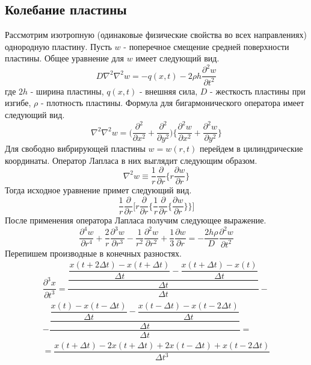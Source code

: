 \subsection{Колебание пластины}
Рассмотрим изотропную (одинаковые физические свойства во всех направлениях) однородную пластину. Пусть $w$ - поперечное смещение средней поверхности пластины.
Общее уравнение для $w$ имеет следующий вид.
\begin{equation}
  D\nabla^2\nabla^2w=-q(x,t)-2\rho h \dfrac{\partial^2 w}{\partial t^2}
\end{equation}
где $2h$ - ширина пластины, $q(x,t)$ - внешняя сила, $D$ - жесткость пластины при изгибе, $\rho$ - плотность пластины.
Формула для бигармонического оператора имеет следующий вид.
\begin{equation}
  \nabla^2\nabla^2w=\bigg(\dfrac{\partial^2}{\partial x^2}+\dfrac{\partial^2}{\partial y^2}\bigg)\bigg\{\dfrac{\partial^2 w}{\partial x^2}+\dfrac{\partial^2 w}{\partial y^2}\bigg\}
\end{equation}
Для свободно вибрирующей пластины $w=w(r,t)$ перейдем в цилиндрические координаты. Оператор Лапласа в них выглядит следующим образом.
\begin{equation}
  \nabla^2 w\equiv \dfrac{1}{r}\dfrac{\partial}{\partial r}\bigg\{r\dfrac{\partial w}{\partial r}\bigg\}
\end{equation}
Тогда исходное уравнение примет следующий вид.
\begin{equation}
  \dfrac{1}{r}\dfrac{\partial}{\partial r}\bigg[r\dfrac{\partial }{\partial r}\bigg\{\dfrac{1}{r}\dfrac{\partial}{\partial r}\bigg\{\dfrac{\partial w}{\partial r}\bigg\}\bigg\}\bigg]
\end{equation}
После применения оператора Лапласа получим следующее выражение.
\begin{equation}
\dfrac{\partial^4 w}{\partial r^4}+\dfrac{2}{r}\dfrac{\partial^3 w}{\partial r^3}-\dfrac{1}{r^2}\dfrac{\partial^2 w}{\partial r^2}+\dfrac{1}
{3}\dfrac{\partial w}{\partial r}=-\dfrac{2h\rho}{D}\dfrac{\partial^2 w}{\partial t^2}
\end{equation}
Перепишем производные в конечных разностях.
\begin{equation}
\begin{split}
  \dfrac{\partial^3 x}{\partial t^3}=\dfrac{\dfrac{\dfrac{x(t+2\Delta t)-x(t+\Delta t)}{\Delta t}-\dfrac{x(t+\Delta t)-x(t)}{\Delta t}}{\Delta t}}{\Delta t}-\\
  -\dfrac{\dfrac{\dfrac{x(t)-x(t-\Delta t)}{\Delta t}-\dfrac{x(t-\Delta t)-x(t-2\Delta t)}{\Delta t}}{\Delta t}}{\Delta t}=\\
  =\dfrac{x(t+\Delta t)-2x(t+\Delta t)+2x(t-\Delta t)+x(t-2\Delta t)}{\Delta t^3}
\end{split}
\end{equation}

